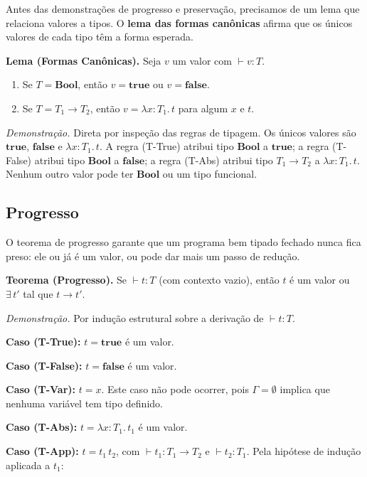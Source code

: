 Antes das demonstrações de progresso e preservação, precisamos de um
lema que relaciona valores a tipos. O \textbf{lema das formas
canônicas} afirma que os únicos valores de cada tipo têm a forma esperada.

\textbf{Lema (Formas Canônicas).} Seja \(v\) um valor com \(\vdash v : T\).

\begin{enumerate}
  \item Se \(T = \mathbf{Bool}\), então \(v = \mathbf{true}\) ou
    \(v = \mathbf{false}\).
  \item Se \(T = T_1 \to T_2\), então \(v = \lambda x {:} T_1.\, t\) para
    algum \(x\) e \(t\).
\end{enumerate}

\emph{Demonstração.} Direta por inspeção das regras de tipagem. Os
únicos valores são \(\mathbf{true}\), \(\mathbf{false}\) e \(\lambda
x {:} T_1.\, t\). A regra (T-True) atribui tipo \(\mathbf{Bool}\) a
\(\mathbf{true}\); a regra (T-False) atribui tipo \(\mathbf{Bool}\) a
\(\mathbf{false}\); a regra (T-Abs) atribui tipo \(T_1 \to T_2\) a
\(\lambda x {:} T_1.\, t\). Nenhum outro valor pode ter
\(\mathbf{Bool}\) ou um tipo funcional.

\subsection{Progresso}

O teorema de progresso garante que um programa bem tipado fechado
nunca fica preso: ele ou já é um valor, ou pode dar mais um passo
de redução.

\textbf{Teorema (Progresso).} Se \(\vdash t : T\) (com contexto
vazio), então \(t\) é um valor ou \(\exists\, t'\) tal que \(t \to t'\).

\emph{Demonstração.} Por indução estrutural sobre a derivação de
\(\vdash t : T\).

\textbf{Caso (T-True):} \(t = \mathbf{true}\) é um valor.

\textbf{Caso (T-False):} \(t = \mathbf{false}\) é um valor.

\textbf{Caso (T-Var):} \(t = x\). Este caso não pode ocorrer, pois
\(\Gamma = \emptyset\) implica que nenhuma
variável tem tipo definido.

\textbf{Caso (T-Abs):} \(t = \lambda x {:} T_1.\, t_1\) é um valor.

\textbf{Caso (T-App):} \(t = t_1\, t_2\), com \(\vdash t_1 : T_1 \to
T_2\) e \(\vdash t_2 : T_1\). Pela hipótese de indução aplicada a \(t_1\):

